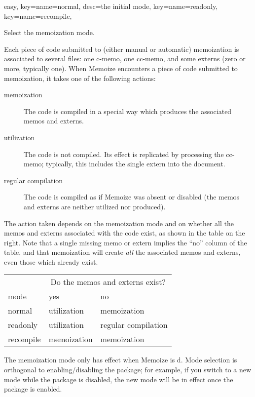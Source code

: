 \documentclass[a4paper,11pt]{article}
\begin{document}
\begin{doc}{easy,
    key={name=normal, desc=the initial mode},
    key={name=readonly},
    key={name=recompile},
  }

  Select the memoization mode.
    
  Each piece of code submitted to (either manual or automatic) memoization is
  associated to several files: one c-memo, one cc-memo, and some externs (zero
  or more, typically one).  When Memoize encounters a piece of code submitted
  to memoization, it takes one of the following actions:
    
  \begin{description}
  \item[memoization] The code is compiled in a special way which produces the
    associated memos and externs.
  \item[utilization] The code is not compiled.  Its effect is replicated by
    processing the cc-memo; typically, this includes the single extern into the
    document.
  \item[regular compilation] The code is compiled as if Memoize was absent or
    disabled (the memos and externs are neither utilized nor produced).
  \end{description}

  \begin{minipage}[t]{0.48\linewidth}
    The action taken depends on the memoization mode and on whether all the
    memos and externs associated with the code exist, as shown in the table on
    the right.  Note that a single missing memo or extern implies the ``no''
    column of the table, and that memoization will create \emph{all} the
    associated memos and externs, even those which already exist.
  \end{minipage}
  \hfill
  \begin{tabular}[t]{@{}lll@{}}
    \toprule
    &\multicolumn{2}{c}{Do the memos and externs exist?}\\
    \cmidrule{2-3}
    mode&yes&no\\
    \midrule
    normal&utilization&memoization\\
    readonly&utilization&regular compilation\\
    recompile&memoization&memoization\\
    \bottomrule
  \end{tabular}

  The memoization mode only has effect when Memoize is d.  Mode
  selection is orthogonal to enabling\slash disabling the package; for example,
  if you switch to a new mode while the package is disabled, the new mode will
  be in effect once the package is enabled.
\end{doc}
\end{document}
